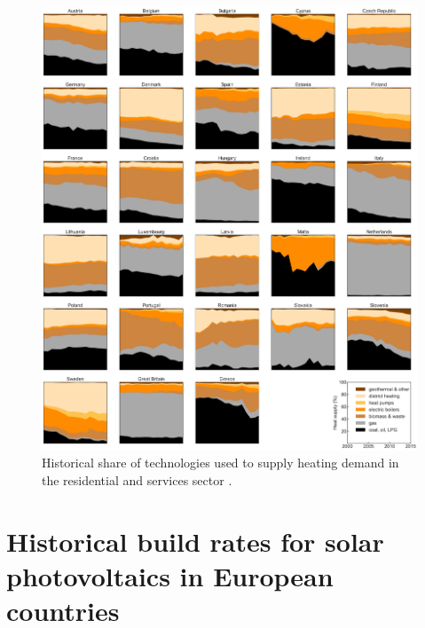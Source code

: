 \documentclass[3p]{elsarticle} %
\begin{document}
\begin{figure}[!h]
\centering
\includegraphics[width=\textwidth]{figures/heating_historical.png}
\caption{Historical share of technologies used to supply heating demand in the residential and services sector \cite{IDEES}. } \label{fig_historical_heating} 
\end{figure}



\FloatBarrier

\clearpage

\section{Historical build rates for solar photovoltaics in European countries}
\end{document}
